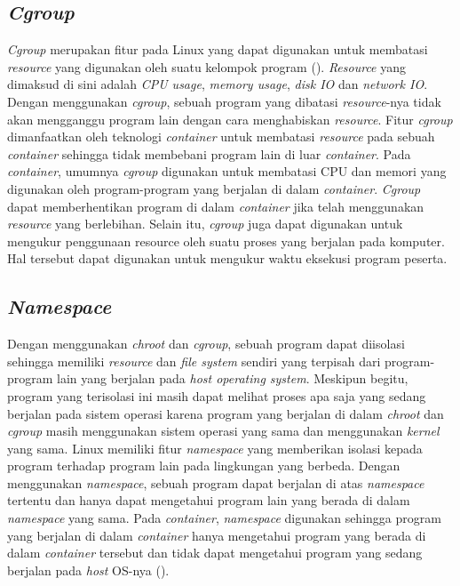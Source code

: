 \subsection{\textit{Cgroup}}


\par \textit{Cgroup} merupakan fitur pada Linux yang dapat digunakan untuk membatasi \textit{resource} yang digunakan oleh suatu kelompok program (\cite{wfeltervmcontainer}). \textit{Resource} yang dimaksud di sini adalah \textit{CPU usage}, \textit{memory usage}, \textit{disk IO} dan \textit{network IO}. Dengan menggunakan \textit{cgroup}, sebuah program yang dibatasi \textit{resource}-nya tidak akan mengganggu program lain dengan cara menghabiskan \textit{resource}. Fitur \textit{cgroup} dimanfaatkan oleh teknologi \textit{container} untuk membatasi \textit{resource} pada sebuah \textit{container} sehingga tidak membebani program lain di luar \textit{container}. Pada \textit{container}, umumnya \textit{cgroup} digunakan untuk membatasi CPU dan memori yang digunakan oleh program-program yang berjalan di dalam \textit{container}. \textit{Cgroup} dapat memberhentikan program di dalam \textit{container} jika telah menggunakan \textit{resource} yang berlebihan. Selain itu, \textit{cgroup} juga dapat digunakan untuk mengukur penggunaan resource oleh suatu proses yang berjalan pada komputer. Hal tersebut dapat digunakan untuk mengukur waktu eksekusi program peserta.

\subsection{\textit{Namespace}}

\par Dengan menggunakan \textit{chroot} dan \textit{cgroup}, sebuah program dapat diisolasi sehingga memiliki \textit{resource} dan \textit{file system} sendiri yang terpisah dari program-program lain yang berjalan pada \textit{host operating system}. Meskipun begitu, program yang terisolasi ini masih dapat melihat proses apa saja yang sedang berjalan pada sistem operasi karena program yang berjalan di dalam \textit{chroot} dan \textit{cgroup} masih menggunakan sistem operasi yang sama dan menggunakan \textit{kernel} yang sama. Linux memiliki fitur \textit{namespace} yang memberikan isolasi kepada program terhadap program lain pada lingkungan yang berbeda. Dengan menggunakan \textit{namespace}, sebuah program dapat berjalan di atas \textit{namespace} tertentu dan hanya dapat mengetahui program lain yang berada di dalam \textit{namespace} yang sama. Pada \textit{container}, \textit{namespace} digunakan sehingga program yang berjalan di dalam \textit{container} hanya mengetahui program yang berada di dalam \textit{container} tersebut dan tidak dapat mengetahui program yang sedang berjalan pada \textit{host} OS-nya (\cite{wfeltervmcontainer}).

